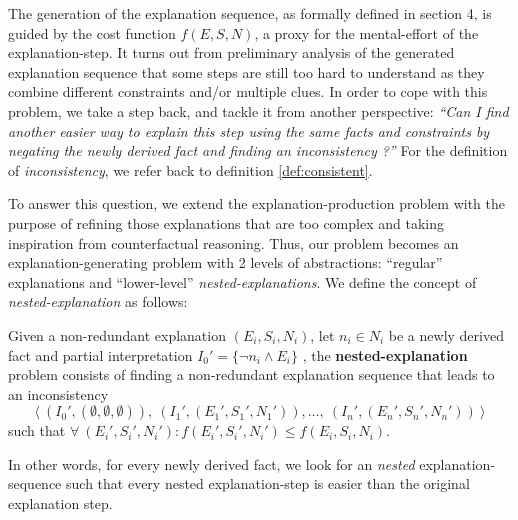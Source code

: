 The generation of the explanation sequence, as formally defined in section 4, is guided by the cost function $f(E, S, N)$, a proxy for the mental-effort of the explanation-step. 
It turns out from preliminary analysis of the generated explanation sequence that some steps are still too hard to understand as they combine different constraints and/or multiple clues. 
In order to cope with this problem, we take a step back, and tackle it from another perspective: \textit{``Can I find another easier way to explain this step using the same facts and constraints by negating the newly derived fact and finding an inconsistency ?''} For the definition of \textit{inconsistency}, we refer back to definition \ref{def:consistent}.


To answer this question, we extend the explanation-production problem with the purpose of refining those explanations that are too complex and taking inspiration from counterfactual reasoning. 
Thus, our problem becomes an explanation-generating problem with 2 levels of abstractions: ``regular'' explanations and ``lower-level'' \textit{nested-explanations}. 
We define the concept of \emph{nested-explanation} as follows:

\begin{definition}
    Given a non-redundant explanation $(E_i, S_i, N_i)$, let $n_i \in N_i$ be a newly derived fact and partial interpretation  $I_0' = \{ \neg n_i \wedge E_i \}$ , the \textbf{nested-explanation} problem consists of finding a non-redundant explanation sequence that leads to an inconsistency 
    \[\langle \ (I_0',(\emptyset,\emptyset,\emptyset)),\ (I_1',(E_1',S_1',N_1')), \dots ,\ (I_n',(E_n',S_n',N_n')) \ \rangle\]
    such that $\forall \ (E_i',S_i',N_i') : f(E_i',S_i',N_i') \leq f(E_i, S_i, N_i)$. 
\end{definition}
In other words, for every newly derived fact, we look for an \emph{nested} explanation-sequence such that every nested explanation-step is easier than the original explanation step.


